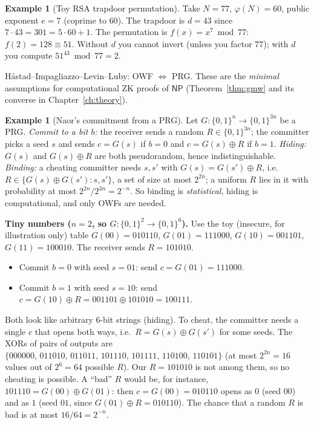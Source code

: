 \documentclass[11pt,a4paper]{report}
\theoremstyle{plain}
\theoremstyle{definition}
\newtheorem{example}[theorem]{Example}
\theoremstyle{remark}
\newcommand{\NP}{\mathsf{NP}}\newcommand{\BPP}{\mathsf{BPP}}\newcommand{\IP}{\mathsf{IP}}
\begin{document}
\begin{example}[Toy RSA trapdoor permutation]\label{ex:rsa}
Take $N=77$, $\varphi(N)=60$, public exponent $e=7$ (coprime to $60$). The trapdoor is $d=43$ since $7\cdot43=301=5\cdot60+1$. The permutation is $f(x)=x^7\bmod77$: $f(2)=128\equiv51$. Without $d$ you cannot invert (unless you factor $77$); with $d$ you compute $51^{43}\bmod77=2$. \checkmark
\end{example}
H\aa stad--Impagliazzo--Levin--Luby: OWF $\Leftrightarrow$ PRG. These are the \emph{minimal} assumptions for computational ZK proofs of $\NP$ (Theorem~\ref{thm:gmw} and its converse in Chapter~\ref{ch:theory}).
\begin{example}[Naor's commitment from a PRG]\label{ex:naor}
Let $G:\{0,1\}^n\to\{0,1\}^{3n}$ be a PRG. \emph{Commit to a bit $b$:} the receiver sends a random $R\in\{0,1\}^{3n}$; the committer picks a seed $s$ and sends $c=G(s)$ if $b=0$ and $c=G(s)\oplus R$ if $b=1$. \emph{Hiding:} $G(s)$ and $G(s)\oplus R$ are both pseudorandom, hence indistinguishable. \emph{Binding:} a cheating committer needs $s,s'$ with $G(s)=G(s')\oplus R$, i.e.\ $R\in\{G(s)\oplus G(s'):s,s'\}$, a set of size at most $2^{2n}$; a uniform $R$ lies in it with probability at most $2^{2n}/2^{3n}=2^{-n}$. So binding is \emph{statistical}, hiding is computational, and only OWFs are needed.

\textbf{Tiny numbers ($n=2$, so $G:\{0,1\}^2\to\{0,1\}^6$).} Use the toy (insecure, for illustration only) table $G(00)=010110$, $G(01)=111000$, $G(10)=001101$, $G(11)=100010$. The receiver sends $R=101010$.
\begin{itemize}
\item Commit $b=0$ with seed $s=01$: send $c=G(01)=111000$.
\item Commit $b=1$ with seed $s=10$: send $c=G(10)\oplus R=001101\oplus101010=100111$.
\end{itemize}
Both look like arbitrary $6$-bit strings (hiding). To cheat, the committer needs a single $c$ that opens both ways, i.e.\ $R=G(s)\oplus G(s')$ for some seeds. The XORs of pairs of outputs are $\{000000,\,011010,\,011011,\,101110,\,101111,\,110100,\,110101\}$ (at most $2^{2n}=16$ values out of $2^6=64$ possible $R$). Our $R=101010$ is not among them, so no cheating is possible. A ``bad'' $R$ would be, for instance, $101110=G(00)\oplus G(01)$: then $c=G(00)=010110$ opens as $0$ (seed $00$) and as $1$ (seed $01$, since $G(01)\oplus R=010110$). The chance that a random $R$ is bad is at most $16/64=2^{-n}$.
\end{example}
\end{document}
